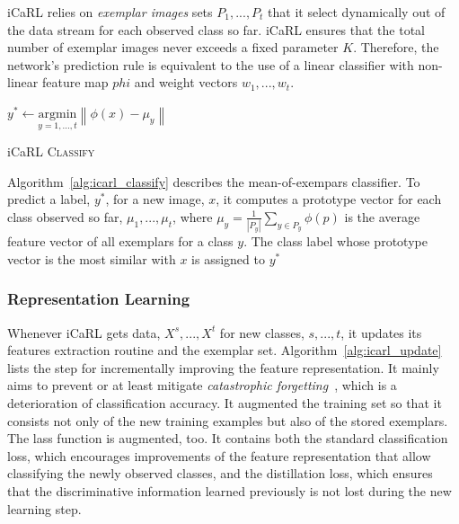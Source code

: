 iCaRL relies on \textit{exemplar images} sets $P_1, ..., P_t$ that it select dynamically out of the data stream for each observed class so far. iCaRL ensures that the total number of exemplar images never exceeds a fixed parameter $K$. Therefore, the network's prediction rule is equivalent to the use of a linear classifier with non-linear feature map $phi$ and weight vectors $w_1, ..., w_t$.

\begin{algorithm}[ht]
  $y^{*} \leftarrow \underset{y = 1, ..., t}{\textrm{argmin}} \left\| \phi(x) - \mu_y \right\|$  \\
  
\caption{ iCaRL \textsc{Classify} \label{alg:icarl_classify}}
\end{algorithm}

Algorithm~\ref{alg:icarl_classify} describes the mean-of-exempars classifier. To predict a label, $y^*$, for a new image, $x$, it computes a prototype vector for each class observed so far, $\mu_1, ..., \mu_t$, where $\mu_y = \frac{1}{\left| P_y \right|} \sum_{y \in P_y} \phi\left( p \right)$ is the average feature vector of all exemplars for a class $y$. The class label whose prototype vector is the most similar with $x$ is assigned to $y^*$

\subsubsection{Representation Learning}
\label{sec:icarl_learning}

Whenever iCaRL gets data, $X^s, ..., X^t$ for new classes, $s, ..., t$, it updates its features extraction routine and the exemplar set. Algorithm~\ref{alg:icarl_update} lists the step for incrementally improving the feature representation. It mainly aims to prevent or at least mitigate \textit{catastrophic forgetting}~\cite{McCloskey:1989aa}, which is a deterioration of classification accuracy. It augmented the training set so that it consists not only of the new training examples but also of the stored exemplars. The lass function is augmented, too. It contains both the standard classification loss, which encourages improvements of the feature representation that allow classifying the newly observed classes, and the distillation loss, which ensures that the discriminative information learned previously is not lost during the new learning step.

